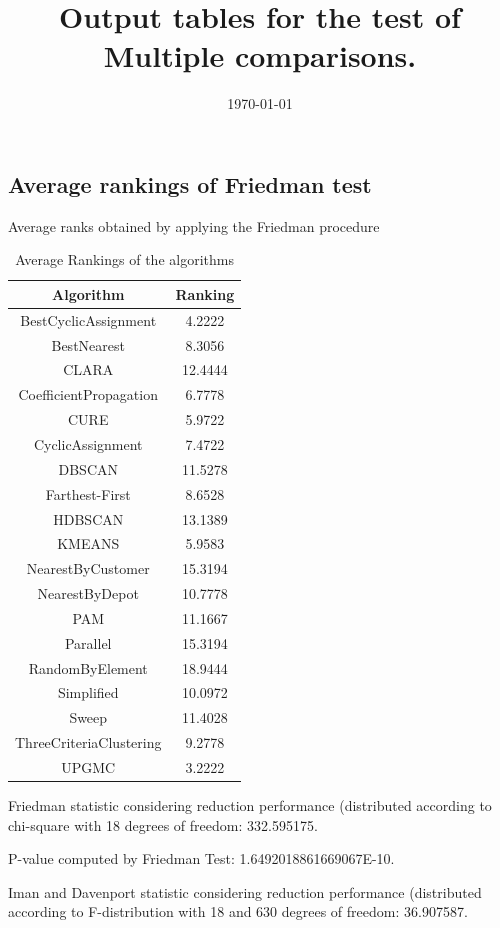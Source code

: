 \documentclass[a4paper,10pt]{article}
\title{Output tables for the test of Multiple comparisons.}
\author{}
\date{\today}
\begin{document}
\begin{landscape}
\pagestyle{empty}
\maketitle
\thispagestyle{empty}
\section{Average rankings of Friedman test}



Average ranks obtained by applying the Friedman procedure

\begin{table}[!htp]
\centering
\begin{tabular}{|c|c|}\hline
Algorithm&Ranking\\\hline
BestCyclicAssignment & 4.2222\\
BestNearest & 8.3056\\
CLARA & 12.4444\\
CoefficientPropagation & 6.7778\\
CURE & 5.9722\\
CyclicAssignment & 7.4722\\
DBSCAN & 11.5278\\
Farthest-First & 8.6528\\
HDBSCAN & 13.1389\\
KMEANS & 5.9583\\
NearestByCustomer & 15.3194\\
NearestByDepot & 10.7778\\
PAM & 11.1667\\
Parallel & 15.3194\\
RandomByElement & 18.9444\\
Simplified & 10.0972\\
Sweep & 11.4028\\
ThreeCriteriaClustering & 9.2778\\
UPGMC & 3.2222\\
\hline
\end{tabular}
\caption{Average Rankings of the algorithms}
\end{table}

Friedman statistic considering reduction performance (distributed according to chi-square with 18 degrees of freedom: 332.595175.

P-value computed by Friedman Test: 1.6492018861669067E-10.\newline

Iman and Davenport statistic considering reduction performance (distributed according to F-distribution with 18 and 630 degrees of freedom: 36.907587.


\end{landscape}
\end{document}
